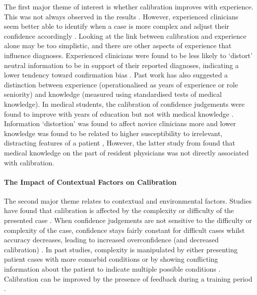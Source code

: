 \documentclass[a4paper, nobind]{templates/ociamthesis}
\begin{document}
The first major theme of interest is whether calibration improves with experience. This was not always observed in the results \autocite{yang_nurses_2010,clayton_are_2023}. However, experienced clinicians seem better able to identify when a case is more complex and adjust their confidence accordingly \autocite{tabak_clinical_1996,brannon_nursing_2003}. Looking at the link between calibration and experience alone may be too simplistic, and there are other aspects of experience that influence diagnoses. Experienced clinicians were found to be less likely to `distort' neutral information to be in support of their reported diagnoses, indicating a lower tendency toward confirmation bias \autocite{kostopoulou_information_2012}. Past work has also suggested a distinction between experience (operationalised as years of experience or role seniority) and knowledge (measured using standardised tests of medical knowledge). In medical students, the calibration of confidence judgements were found to improve with years of education but not with medical knowledge \autocite{hautz_diagnostic_2019}. Information `distortion' was found to affect novice clinicians more \autocite{kostopoulou_information_2012} and lower knowledge was found to be related to higher susceptibility to irrelevant, distracting features of a patient \autocite{mamede_role_2024}, However, the latter study from \textcite{mamede_role_2024} found that medical knowledge on the part of resident physicians was not directly associated with calibration.

\paragraph{The Impact of Contextual Factors on Calibration}\label{the-impact-of-contextual-factors-on-calibration}

The second major theme relates to contextual and environmental factors. Studies have found that calibration is affected by the complexity or difficulty of the presented case \autocite{meyer_physicians_2013,hausmann_sensitivity_2019,li_relationship_2023}. When confidence judgements are not sensitive to the difficulty or complexity of the case, confidence stays fairly constant for difficult cases whilst accuracy decreases, leading to increased overconfidence (and decreased calibration) \autocite{meyer_physicians_2013}. In past studies, complexity is manipulated by either presenting patient cases with more comorbid conditions \autocite{hausmann_sensitivity_2019} or by showing conflicting information about the patient to indicate multiple possible conditions \autocite{yang_nurses_2010}. Calibration can be improved by the presence of feedback during a training period \autocite{kuhn_improving_2022,staal_impact_2024}.
\end{document}
